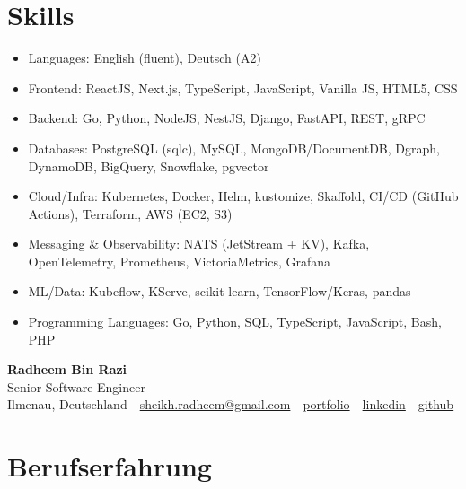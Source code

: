 \documentclass[10pt,a4paper]{resume}
\makeatletter
\newcommand{\Portfolio}{https://radheem.github.io/my-cv}
\newcommand{\PortfolioText}{portfolio}
\newcommand{\GitHub}{https://github.com/radheem}
\newcommand{\LinkedIn}{https://www.linkedin.com/in/radheem-razi}
\newcommand{\Email}{sheikh.radheem@gmail.com}
\makeatother
\begin{document}
\section{Skills}

\begin{itemize}[leftmargin=1.4em,nosep,topsep=2pt]
  \item Languages: English (fluent), Deutsch (A2)
  \item Frontend: ReactJS, Next.js, TypeScript, JavaScript, Vanilla JS, HTML5, CSS
  \item Backend: Go, Python, NodeJS, NestJS, Django, FastAPI, REST, gRPC
  \item Databases: PostgreSQL (sqlc), MySQL, MongoDB/DocumentDB, Dgraph, DynamoDB, BigQuery, Snowflake, pgvector
  \item Cloud/Infra: Kubernetes, Docker, Helm, kustomize, Skaffold, CI/CD (GitHub Actions), Terraform, AWS (EC2, S3)
  \item Messaging \& Observability: NATS (JetStream + KV), Kafka, OpenTelemetry, Prometheus, VictoriaMetrics, Grafana
  \item ML/Data: Kubeflow, KServe, scikit-learn, TensorFlow/Keras, pandas
  \item Programming Languages: Go, Python, SQL, TypeScript, JavaScript, Bash, PHP
\end{itemize}

\clearpage
{}

\begin{center}
  {\huge\bfseries Radheem Bin Razi}\\[3pt]
  {\large Senior Software Engineer}\\[6pt]
  \small
  Ilmenau, Deutschland \,\textbar\,
  \href{mailto:\Email}{\Email} \,\textbar\,
  \href{\Portfolio}{\PortfolioText} \,\textbar\,
  \href{\LinkedIn}{linkedin} \,\textbar\,
  \href{\GitHub}{github}
\end{center}
\vspace{2pt}

\section{Berufserfahrung}
\end{document}
